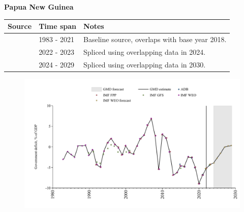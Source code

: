 \documentclass[12pt,a4paper,landscape]{article}
\begin{document}
\begin{adjustbox}{max totalsize={\paperwidth}{\paperheight},center}
\begin{minipage}[t][\textheight][t]{\textwidth}
\vspace*{0.5cm}
{}
\begin{center}
{\Large\bfseries Papua New Guinea}
\end{center}
\vspace{0.5cm}
\begin{table}[H]
\centering
\small
\begin{tabular}{|l|l|l|}
\hline
\textbf{Source} & \textbf{Time span} & \textbf{Notes} \\
\hline
\rowcolor{white}\cite{IMF_WEO}& 1983 - 2021 &Baseline source, overlaps with base year 2018.\\
\rowcolor{lightgray}\cite{IMF_GFS}& 2022 - 2023 &Spliced using overlapping data in 2024.\\
\rowcolor{white}\cite{IMF_WEO_forecast}& 2024 - 2029 &Spliced using overlapping data in 2030.\\
\hline
\end{tabular}
\end{table}
\begin{figure}[H]
\centering
\includegraphics[width=\textwidth,height=0.6\textheight,keepaspectratio]{graphs/PNG_govdef_GDP.pdf}
\end{figure}
\end{minipage}
\end{adjustbox}
\end{document}
